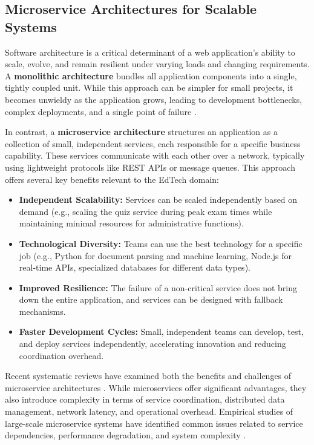 \subsection{Microservice Architectures for Scalable Systems}

Software architecture is a critical determinant of a web application's ability to scale, evolve, and remain resilient under varying loads and changing requirements. A \textbf{monolithic architecture} bundles all application components into a single, tightly coupled unit. While this approach can be simpler for small projects, it becomes unwieldy as the application grows, leading to development bottlenecks, complex deployments, and a single point of failure \citep{richards2020}.

In contrast, a \textbf{microservice architecture} structures an application as a collection of small, independent services, each responsible for a specific business capability. These services communicate with each other over a network, typically using lightweight protocols like REST APIs or message queues. This approach offers several key benefits relevant to the EdTech domain:

\begin{itemize}
    \item \textbf{Independent Scalability:} Services can be scaled independently based on demand (e.g., scaling the quiz service during peak exam times while maintaining minimal resources for administrative functions).
    
    \item \textbf{Technological Diversity:} Teams can use the best technology for a specific job (e.g., Python for document parsing and machine learning, Node.js for real-time APIs, specialized databases for different data types).
    
    \item \textbf{Improved Resilience:} The failure of a non-critical service does not bring down the entire application, and services can be designed with fallback mechanisms.
    
    \item \textbf{Faster Development Cycles:} Small, independent teams can develop, test, and deploy services independently, accelerating innovation and reducing coordination overhead.
\end{itemize}

Recent systematic reviews have examined both the benefits and challenges of microservice architectures \citep{richards2020}. While microservices offer significant advantages, they also introduce complexity in terms of service coordination, distributed data management, network latency, and operational overhead. Empirical studies of large-scale microservice systems have identified common issues related to service dependencies, performance degradation, and system complexity \citep{richards2020}.

